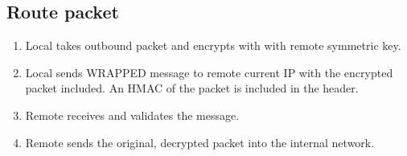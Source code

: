 \subsection{Route packet}
\label{sec:arg_protocol_route}
\begin{enumerate}
	\item Local takes outbound packet and encrypts with with remote symmetric key.
	\item Local sends WRAPPED message to remote current IP with the encrypted packet included. An \ac{HMAC} of the packet is included in the header.
	\item Remote receives and validates the message.
	\item Remote sends the original, decrypted packet into the internal network.
\end{enumerate}

